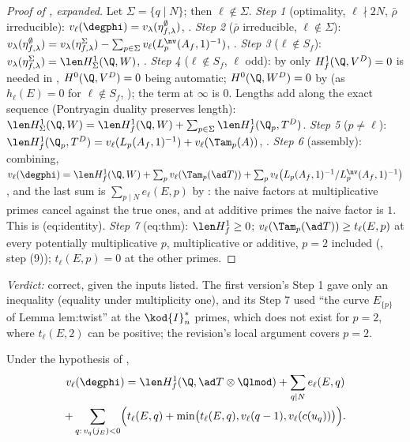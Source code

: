 \begin{sloppypar}
\begin{proof}[Proof of , expanded]
Let $\Sigma=\{q\mid N\}$; then $\ell\notin\Sigma$.
\emph{Step 1} (optimality, $\ell\nmid2N$, $\bar\rho$ irreducible): $v_\ell(\degphi)=v_\lambda(\eta^\emptyset_{f,\lambda})$, .
\emph{Step 2} ($\bar\rho$ irreducible, $\ell\notin\Sigma$): $v_\lambda(\eta^\emptyset_{f,\lambda})=v_\lambda(\eta^\Sigma_{f,\lambda})-\sum_{p\in\Sigma}v_\ell(L^{\nv}_p(A_f,1)^{-1})$, .
\emph{Step 3} ($\ell\notin S_f$): $v_\lambda(\eta^\Sigma_{f,\lambda})=\len H^1_\Sigma(\Q,W)$, .
\emph{Step 4} ($\ell\notin S_f$, $\ell$ odd): by  only $H^1_f(\Q,V^D)=0$ is needed in , $H^0(\Q,V^D)=0$ being automatic; $H^0(\Q,W^D)=0$ by
 (as $h_\ell(E)=0$ for $\ell\notin S_f$, ); the term at $\infty$ is $0$. Lengths add along the exact sequence (Pontryagin duality preserves length):
$\len H^1_\Sigma(\Q,W)=\len H^1_f(\Q,W)+\sum_{p\in\Sigma}\len H^1_f(\Q_p,T^D)$.
\emph{Step 5} ($p\ne\ell$): $\len H^1_f(\Q_p,T^D)=v_\ell(L_p(A_f,1)^{-1})+v_\ell(\Tam_p(A))$, .
\emph{Step 6} (assembly): combining, $v_\ell(\degphi)=\len H^1_f(\Q,W)+\sum_pv_\ell(\Tam_p(\ad T))+\sum_pv_\ell\bigl(L_p(A_f,1)^{-1}/L^{\nv}_p(A_f,1)^{-1}\bigr)$, and the last sum is $\sum_{p\mid N}e_\ell(E,p)$ by
: the naive factors at multiplicative primes cancel against the true ones, and at additive primes the naive factor is $1$. This is (eq:identity).
\emph{Step 7} (eq:thm): $\len H^1_f\ge0$; $v_\ell(\Tam_p(\ad T))\ge t_\ell(E,p)$ at every potentially multiplicative $p$, multiplicative or additive, $p=2$ included (, step
(9)); $t_\ell(E,p)=0$ at the other primes.
\end{proof}

\noindent\emph{Verdict:} correct, given the inputs listed. The first version's Step 1 gave only an inequality (equality under multiplicity one), and its Step 7 used
``the curve $E_{\{p\}}$ of Lemma lem:twist'' at the $\kod{I}_n^*$ primes, which does not exist for $p=2$, where $t_\ell(E,2)$ can be positive; the revision's local argument covers $p=2$.

\begin{corollary}\label{cor:paper:explicit}
Under the hypothesis of ,
\begin{multline*}
v_\ell(\degphi)=\len H^1_f(\Q,\ad T\otimes\Qlmod)+\sum_{q\mid N}e_\ell(E,q)\\
+\sum_{q:\,v_q(j_E)<0}\Bigl(t_\ell(E,q)+\min\bigl(t_\ell(E,q),v_\ell(q-1),v_\ell(c(u_q))\bigr)\Bigr).
\end{multline*}
\end{corollary}


\end{sloppypar}
